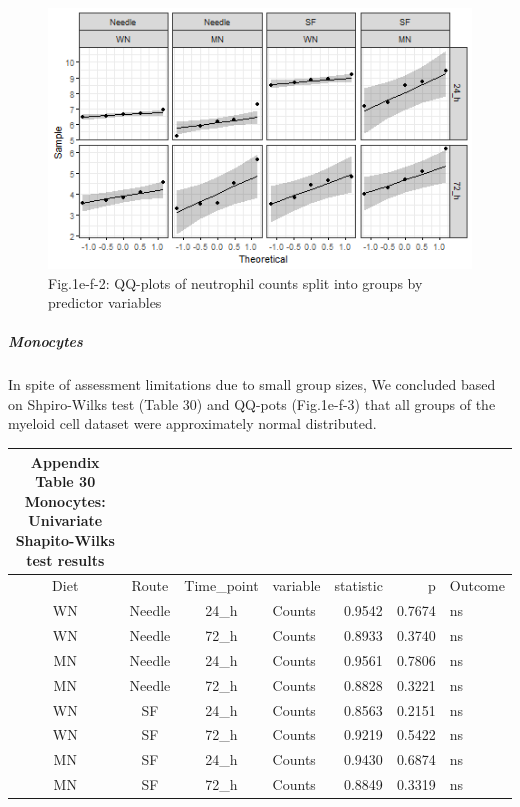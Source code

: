 \documentclass[
  12pt,
  letterpaper,
]{article}
\begin{document}
\begin{figure}[H]

{\centering \includegraphics[width=0.95\linewidth,]{Statistics_report_files/figure-latex/qq-plot-figure-1e-f-neutrophils-1} 

}

\caption{Fig.1e-f-2: QQ-plots of neutrophil counts split into groups by predictor variables}\label{fig:qq-plot-figure-1e-f-neutrophils}
\end{figure}

\subparagraph{Monocytes}\label{monocytes-2}

In spite of assessment limitations due to small group sizes, We concluded based on Shpiro-Wilks test (Table 30) and QQ-pots (Fig.1e-f-3) that all groups of the myeloid cell dataset were approximately normal distributed.

\begin{longtable}{ccclrrl}
\caption*{
{\large \textbf{Appendix Table 30}} \\ 
{\small \textbf{Monocytes: Univariate Shapito-Wilks test results}}
} \\ 
\toprule
Diet & Route & Time\_point & variable & statistic & p & Outcome \\ 
\midrule\addlinespace[2.5pt]
WN & Needle & 24\_h & Counts & 0.9542 & 0.7674 & ns \\ 
WN & Needle & 72\_h & Counts & 0.8933 & 0.3740 & ns \\ 
MN & Needle & 24\_h & Counts & 0.9561 & 0.7806 & ns \\ 
MN & Needle & 72\_h & Counts & 0.8828 & 0.3221 & ns \\ 
WN & SF & 24\_h & Counts & 0.8563 & 0.2151 & ns \\ 
WN & SF & 72\_h & Counts & 0.9219 & 0.5422 & ns \\ 
MN & SF & 24\_h & Counts & 0.9430 & 0.6874 & ns \\ 
MN & SF & 72\_h & Counts & 0.8849 & 0.3319 & ns \\ 
\bottomrule
\end{longtable}
\end{document}
